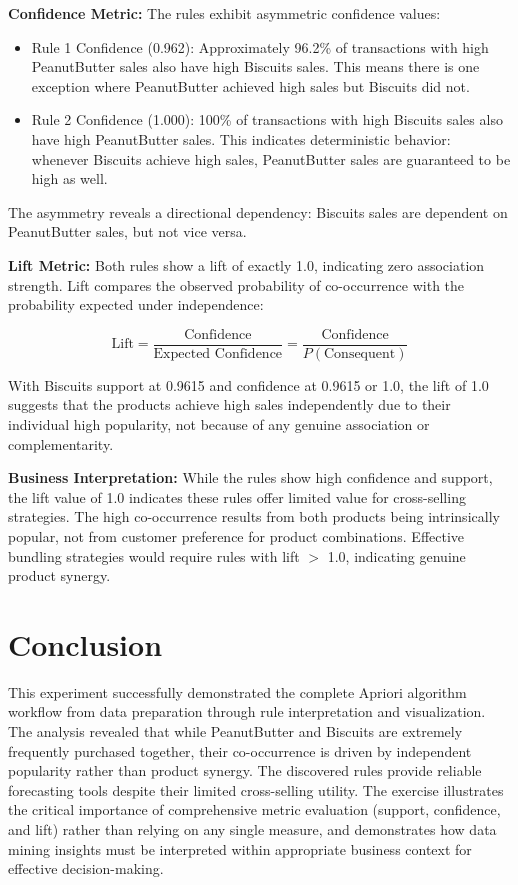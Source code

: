 \documentclass[12pt,a4paper]{article}
\begin{document}
\textbf{Confidence Metric:} The rules exhibit asymmetric confidence values:
\begin{itemize}
    \item Rule 1 Confidence (0.962): Approximately 96.2\% of transactions with high PeanutButter sales also have high Biscuits sales. This means there is one exception where PeanutButter achieved high sales but Biscuits did not.
    \item Rule 2 Confidence (1.000): 100\% of transactions with high Biscuits sales also have high PeanutButter sales. This indicates deterministic behavior: whenever Biscuits achieve high sales, PeanutButter sales are guaranteed to be high as well.
\end{itemize}

The asymmetry reveals a directional dependency: Biscuits sales are dependent on PeanutButter sales, but not vice versa.

\textbf{Lift Metric:} Both rules show a lift of exactly 1.0, indicating zero association strength. Lift compares the observed probability of co-occurrence with the probability expected under independence:

\[
\text{Lift} = \frac{\text{Confidence}}{\text{Expected Confidence}} = \frac{\text{Confidence}}{P(\text{Consequent})}
\]

With Biscuits support at 0.9615 and confidence at 0.9615 or 1.0, the lift of 1.0 suggests that the products achieve high sales independently due to their individual high popularity, not because of any genuine association or complementarity.

\textbf{Business Interpretation:} While the rules show high confidence and support, the lift value of 1.0 indicates these rules offer limited value for cross-selling strategies. The high co-occurrence results from both products being intrinsically popular, not from customer preference for product combinations. Effective bundling strategies would require rules with lift $>$ 1.0, indicating genuine product synergy.










\section{Conclusion}

This experiment successfully demonstrated the complete Apriori algorithm workflow from data preparation through rule interpretation and visualization. The analysis revealed that while PeanutButter and Biscuits are extremely frequently purchased together, their co-occurrence is driven by independent popularity rather than product synergy. The discovered rules provide reliable forecasting tools despite their limited cross-selling utility. The exercise illustrates the critical importance of comprehensive metric evaluation (support, confidence, and lift) rather than relying on any single measure, and demonstrates how data mining insights must be interpreted within appropriate business context for effective decision-making.
\end{document}
